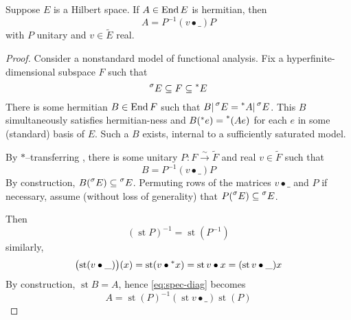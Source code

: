 \documentclass{scrartcl}
\newcommand{\hyper}[1]{\prescript{*}{}{#1}}
\newcommand{\standard}[1]{\prescript{\sigma}{}{#1}}
\DeclareMathOperator{\st}{st}
\begin{document}
\begin{theorem}
  Suppose $E$ is a Hilbert space. 
  If $A\in\operatorname{End} E$ is hermitian, then
  \[
    A = P^{-1}(v\bullet \_)P
  \]
  with $P$ unitary and $v\in \tilde E$ real.
\end{theorem}
\begin{proof}
  Consider a nonstandard model of functional analysis. 
  Fix a hyperfinite-dimensional subspace $F$ such that
  \[
    \standard E \subseteq F \subseteq \hyper E
  \]
  There is some hermitian $B\in\operatorname{End} F$ such that $B|\standard E = \hyper A|\standard E$. This $B$ simultaneously satisfies hermitian-ness and $B(\hyper e)=\hyper(Ae)$ for each $e$ in some (standard) basis of $E$. Such a $B$ exists, internal to a sufficiently saturated model.

  By $*$--transferring , there is some unitary $P:F\xrightarrow{\sim} \tilde F$ and real $v\in \tilde F$ such that
  \begin{equation}
    B = P^{-1}(v\bullet\_)P
    \label{eq:spec-diag}
  \end{equation}
  By construction, $B(\standard E) \subseteq \standard E$. Permuting rows of the matrices $v\bullet\_$ and $P$ if necessary, assume (without loss of generality) that $P(\standard E)\subseteq \standard E$. 
  
  Then
  \[
    (\st P)^{-1}=\st(P^{-1})
  \]
  similarly,
  \[
    \bigl(\st(v\bullet\_)\bigr)(x)=\st(v\bullet\hyper x) = \st v\bullet x = (\st v\bullet\_)x
  \]
  By construction, $\st B=A$, hence \cref{eq:spec-diag} becomes
  \[
    A=\st(P)^{-1} (\st v\bullet\_) \st(P)
  \]
\end{proof}
\end{document}
